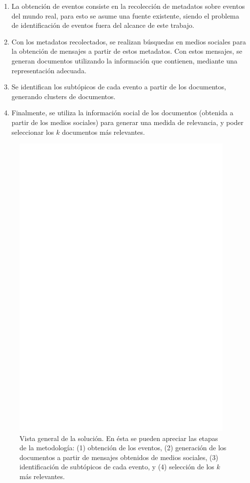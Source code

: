 \begin{enumerate}
\item La obtención de eventos consiste en la recolección de metadatos
     sobre eventos del mundo real, para esto se asume una fuente
     existente, siendo el problema de identificación de eventos fuera
     del alcance de este trabajo.
\item Con los metadatos recolectados, se realizan búsquedas en medios
     sociales para la obtención de mensajes a partir de estos
     metadatos. Con estos mensajes, se generan documentos utilizando la
     información que contienen, mediante una representación adecuada.
\item Se identifican los subtópicos de cada evento a partir de los
     documentos, generando clusters de documentos.
\item Finalmente, se utiliza la información social de los documentos
     (obtenida a partir de los medios sociales) para generar una medida
     de relevancia, y poder seleccionar los $k$ documentos más
     relevantes.
\end{enumerate}
  \begin{figure}[h!b]
  \centering
  \includegraphics[width=11cm]{./dia/model2.ps}
  \caption[Vista general de la solución.]
   {Vista general de la solución\label{fig:overview}. En ésta se
  pueden apreciar las etapas de la metodología: (1) obtención de los
  eventos, (2) generación de los documentos a partir de mensajes
  obtenidos de medios sociales, (3) identificación de subtópicos de
  cada evento, y (4) selección de los $k$ más relevantes.}
  \end{figure}

